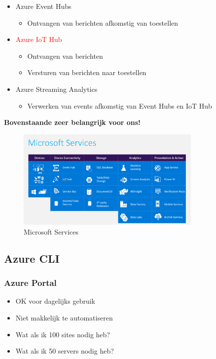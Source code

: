 \documentclass{article}
\newcommand{\bold}[1]{\textbf{#1}}
\begin{document}
\begin{itemize}
    \item Azure Event Hubs
    \begin{itemize}
        \item Ontvangen van berichten afkomstig van toestellen
    \end{itemize}
    \item \textcolor{red}{Azure IoT Hub}
    \begin{itemize}
        \item Ontvangen van berichten
        \item Versturen van berichten naar toestellen
    \end{itemize}
    \item Azure Streaming Analytics
    \begin{itemize}
        \item Verwerken van events afkomstig van Event Hubs en IoT Hub
    \end{itemize}
\end{itemize}

\bold{Bovenstaande zeer belangrijk voor ons!}

\begin{figure}[H]
    \centering
    \includegraphics[width=0.8\textwidth]{azure-iot-microsoft-services.png}
    \caption{Microsoft Services}
\end{figure}

\subsection{Azure CLI}

\subsubsection{Azure Portal}

\begin{itemize}
    \item OK voor dagelijks gebruik
    \item Niet makkelijk te automatiseren
    \item Wat als ik 100 sites nodig heb?
    \item Wat als ik 50 servers nodig heb?
\end{itemize}
\end{document}
